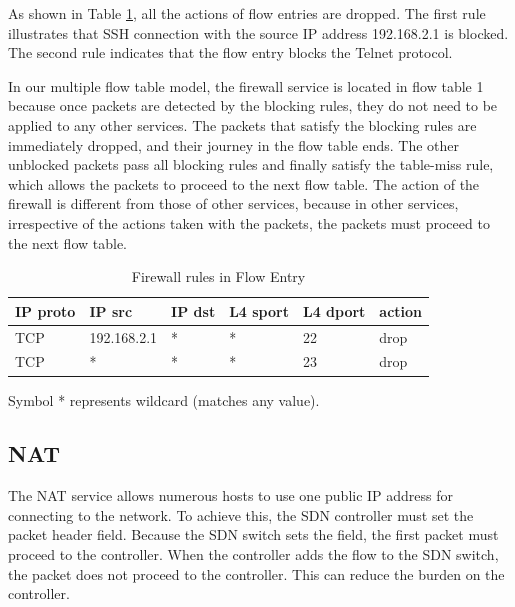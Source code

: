 \documentclass[conference]{IEEEtran}
\begin{document}
As shown in Table \ref{table:fw}, all the actions of flow entries are dropped. The first rule illustrates that SSH connection with the source IP address 192.168.2.1 is blocked. The second rule indicates that the flow entry blocks the Telnet protocol.

In our multiple flow table model, the firewall service is located in flow table 1 because once packets are detected by the blocking rules, they do not need to be applied to any other services. The packets that satisfy the blocking rules are immediately dropped, and their journey in the flow table ends. The other unblocked packets pass all blocking rules and finally satisfy the table-miss rule, which allows the packets to proceed to the next flow table. The action of the firewall is different from those of other services, because in other services, irrespective of the actions taken with the packets, the packets must proceed to the next flow table.

\begin{table}[!t]
\caption{Firewall rules in Flow Entry}
\label{table:fw}
\centering
\begin{threeparttable}
\begin{tabular}{|l|l|l|l|l|l|}
\hline
IP proto & IP src      & IP dst       & L4 sport & L4 dport & action \\ \hline
TCP      & 192.168.2.1 & *            & *        & 22       & drop   \\ \hline
TCP      & *           & *            & *        & 23       & drop   \\ \hline
\end{tabular}
  \begin{tablenotes}
    \item[] Symbol * represents wildcard (matches any value).
  \end{tablenotes}
\end{threeparttable}
\end{table}



\subsection{NAT}
The NAT service allows numerous hosts to use one public IP address for connecting to the network. To achieve this, the SDN controller must set the packet header field. Because the SDN switch sets the field, the first packet must proceed to the controller. When the controller adds the flow to the SDN switch, the packet does not proceed to the controller. This can reduce the burden on the controller.
\end{document}
